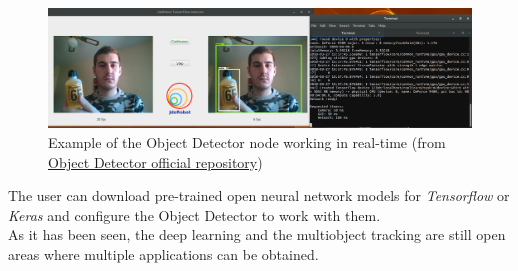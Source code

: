 \begin{figure}[H]
\begin{center}
\includegraphics[scale=0.25]{figures/object_detector.png}
\caption{Example of the Object Detector node working in real-time (from \href{https://github.com/JdeRobot/dl-objectdetector}{Object Detector official repository})}
\label{fig:object_detector}
\end{center}
\end{figure}
The user can download pre-trained open neural network models for \textit{Tensorflow} or \textit{Keras} and configure the Object Detector to work with them.\\
As it has been seen, the deep learning and the multiobject tracking are still open areas where multiple applications can be obtained.\\

